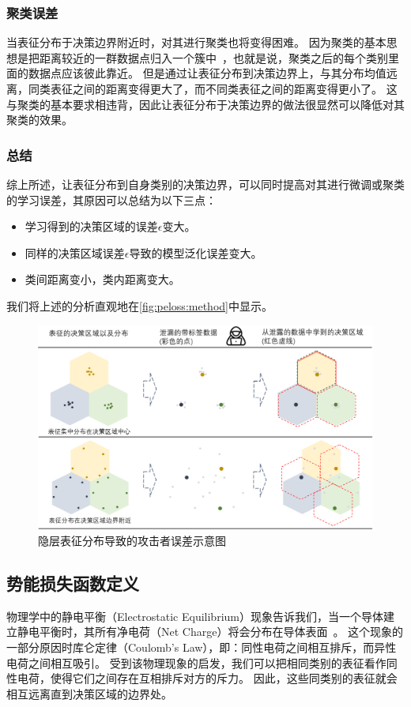 %
\subsubsection{聚类误差}
当表征分布于决策边界附近时，对其进行聚类也将变得困难。
%
因为聚类的基本思想是把距离较近的一群数据点归入一个簇中~\cite{saxena2017cluster_review,murtagh_2012_cluster}，也就是说，聚类之后的每个类别里面的数据点应该彼此靠近。
%
但是通过让表征分布到决策边界上，与其分布均值远离，同类表征之间的距离变得更大了，而不同类表征之间的距离变得更小了。
%
这与聚类的基本要求相违背，因此让表征分布于决策边界的做法很显然可以降低对其聚类的效果。


\subsubsection{总结}
综上所述，让表征分布到自身类别的决策边界，可以同时提高对其进行微调或聚类的学习误差，其原因可以总结为以下三点：
\begin{itemize}
    \item 学习得到的决策区域的误差$\epsilon$变大。
    \item 同样的决策区域误差$\epsilon$导致的模型泛化误差变大。
    \item 类间距离变小，类内距离变大。
\end{itemize}
我们将上述的分析直观地在\autoref{fig:peloss:method}中显示。

\begin{figure}[h!]
    \centering
    \includegraphics[width=1\linewidth]{Z_Resources/peloss_method.png}
    \caption{隐层表征分布导致的攻击者误差示意图}
    \label{fig:peloss:method}
\end{figure}


\subsection{势能损失函数定义}
物理学中的静电平衡（Electrostatic Equilibrium）现象告诉我们，当一个导体建立静电平衡时，其所有净电荷（Net Charge）将会分布在导体表面~\cite{griffiths2005introduction}。
%
这个现象的一部分原因时库仑定律（Coulomb's Law），即：同性电荷之间相互排斥，而异性电荷之间相互吸引。
%
受到该物理现象的启发，我们可以把相同类别的表征看作同性电荷，使得它们之间存在互相排斥对方的斥力。
因此，这些同类别的表征就会相互远离直到决策区域的边界处。
%

